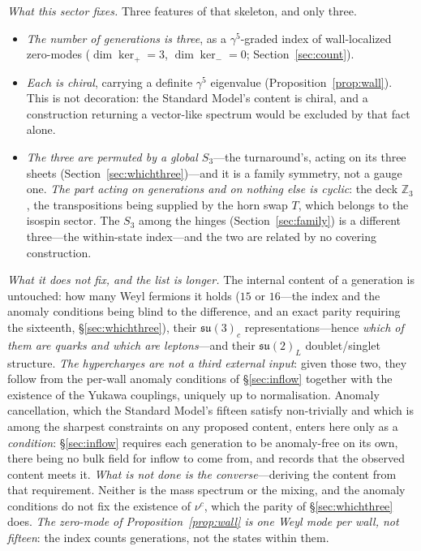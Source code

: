 \documentclass[11pt]{article}
\newcommand{\su}{\mathfrak{su}}
\begin{document}
\emph{What this sector fixes.} Three features of that skeleton, and only three.
\begin{itemize}
\item \emph{The number of generations is three}, as a $\gamma^5$-graded index of wall-localized zero-modes
($\dim\ker_+=3$, $\dim\ker_-=0$; Section~\ref{sec:count}).
\item \emph{Each is chiral}, carrying a definite $\gamma^5$ eigenvalue (Proposition~\ref{prop:wall}). This is
not decoration: the Standard Model's content is chiral, and a construction returning a vector-like spectrum
would be excluded by that fact alone.
\item \emph{The three are permuted by a global $S_3$}---the turnaround's, acting on its three sheets
(Section~\ref{sec:whichthree})---and it is a family symmetry, not a gauge one. \emph{The part acting on
generations and on nothing else is cyclic}: the deck $\mathbb{Z}_3$, the transpositions being supplied by the
horn swap $T$, which belongs to the isospin sector. The $S_3$ among the hinges (Section~\ref{sec:family}) is a
different three---the within-state index---and the two are related by no covering construction.
\end{itemize}

\emph{What it does not fix, and the list is longer.} The internal content of a generation is untouched: how
many Weyl fermions it holds ($15$ or $16$---the index and the anomaly conditions being blind to the difference, and an exact parity requiring the sixteenth, \S\ref{sec:whichthree}), their $\su(3)_c$ representations---hence \emph{which of them are quarks and which are leptons}---and their $\su(2)_L$ doublet/singlet structure. \emph{The hypercharges are not a third external input}: given those two, they follow from the per-wall anomaly conditions of \S\ref{sec:inflow} together with the existence of the Yukawa couplings, uniquely up to normalisation. Anomaly
cancellation, which the Standard Model's fifteen satisfy non-trivially and which is among the sharpest
constraints on any proposed content, enters here only as a \emph{condition}: \S\ref{sec:inflow} requires each generation to be anomaly-free on its own, there being no bulk field for inflow to come from, and records that the observed content meets it. \emph{What is not done is the converse}---deriving the content from that requirement. Neither is the mass spectrum or the mixing, and the anomaly conditions do not fix the
existence of $\nu^{c}$, which the parity of \S\ref{sec:whichthree} does. \emph{The zero-mode of Proposition~\ref{prop:wall} is one Weyl mode per wall, not
fifteen}: the index counts generations, not the states within them.
\end{document}
